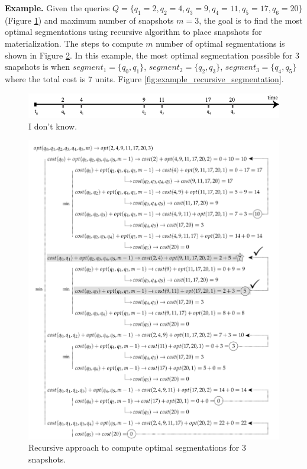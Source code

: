 \textbf{Example.} Given the queries $Q=\{q_1=2,q_2=4,q_3=9,q_4=11,q_5=17,q_6=20\}$ (Figure \ref{fig:example_recursive_queries}) and maximum number of snapshots $m=3$, the goal is to find the most optimal segmentations using recursive algorithm to place snapshots for materialization. The steps to compute $m$ number of optimal segmentations is shown in Figure \ref{fig:example_recursive_steps}. In this example, the most optimal segmentation possible for 3 snapshots is when $segment_1 = \{q_0,q_1\}$, $segment_2 = \{q_2,q_3\}$, $segment_3= \{q_4,q_5\}$ where the total cost is 7 units. Figure \ref{fig:example_recursive_segmentation}.

\begin{figure}[b]
	\label{fig:example_recursive_queries}
	\centering
	\includegraphics[width=\textwidth]{figs/example_recursive_q.pdf}
	\caption{I don't know.}
\end{figure}

\begin{figure}
	\label{fig:example_recursive_steps}
	\centering
	\includegraphics[width=\textwidth]{figs/recursion_example.pdf}
	\caption{Recursive approach to compute optimal segmentations for 3 snapshots.}
\end{figure}


